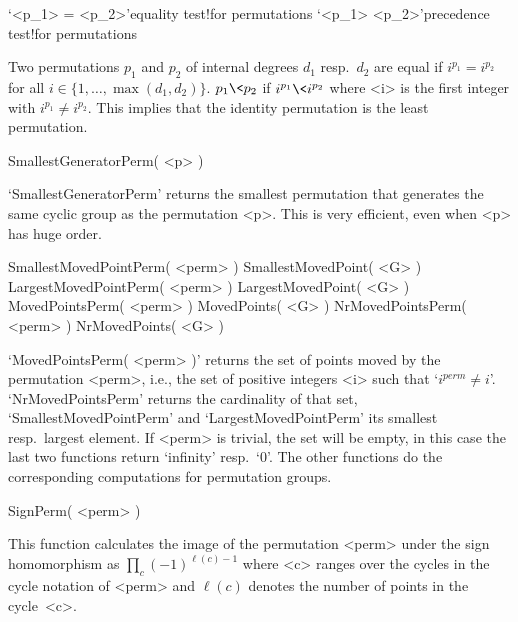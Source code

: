 
\>`<p_1> = <p_2>'{equality test}!{for permutations}
\>`<p_1> \< <p_2>'{precedence test}!{for permutations}

Two permutations $p_1$  and  $p_2$ of internal degrees  $d_1$ resp.~$d_2$
are equal   if $i^{p_1} =  i^{p_2}$   for all $i\in\{1,\ldots,\allowbreak
\max(d_1,d_2)\}$. $p_1\<p_2$ if $i^{p_1}  \<  i^{p_2}$ where <i> is   the
first integer with $i^{p_1} \ne i^{p_2}$.  This implies that the identity
permutation is the least permutation.

\>SmallestGeneratorPerm( <p> )

`SmallestGeneratorPerm' returns  the smallest  permutation that generates
the  same cyclic group  as the permutation   <p>. This is very efficient,
even when <p> has huge order.


\>SmallestMovedPointPerm( <perm> )
\>SmallestMovedPoint( <G> )
\>LargestMovedPointPerm( <perm> )
\>LargestMovedPoint( <G> )
\>MovedPointsPerm( <perm> )
\>MovedPoints( <G> )
\>NrMovedPointsPerm( <perm> )
\>NrMovedPoints( <G> )

`MovedPointsPerm(   <perm> )'  returns the   set of points  moved by  the
permutation <perm>,  i.e., the set   of positive integers  <i> such  that
`$i^{perm}\ne i$'.  `NrMovedPointsPerm'  returns the cardinality  of that
set, `SmallestMovedPointPerm'    and `LargestMovedPointPerm' its smallest
resp.\ largest  element. If <perm> is trivial,  the set will be empty, in
this case  the last two functions  return `infinity' resp.~`0'. The other
functions do the corresponding computations for permutation groups.

\null

\>SignPerm( <perm> )

This function calculates  the image of  the permutation <perm> under  the
sign homomorphism as  $\prod_{c} (-1)^{\ell(c)-1}$ where <c>  ranges over
the  cycles  in the cycle  notation of  <perm> and $\ell(c)$  denotes the
number of points in the cycle~<c>.

\null

